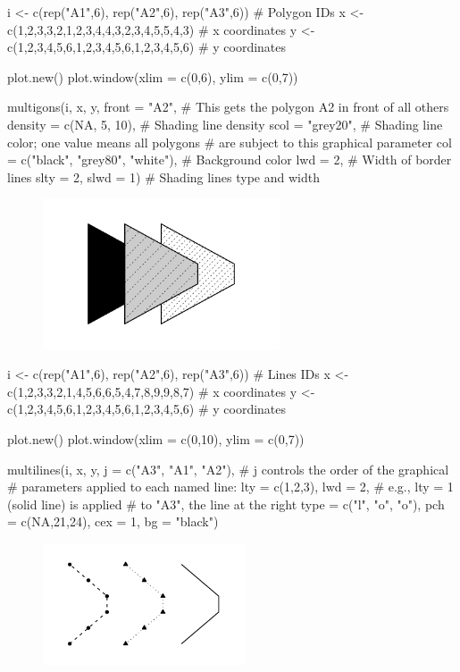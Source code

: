 \begin{example}
i <- c(rep("A1",6), rep("A2",6), rep("A3",6)) # Polygon IDs
x <- c(1,2,3,3,2,1,2,3,4,4,3,2,3,4,5,5,4,3)   # x coordinates
y <- c(1,2,3,4,5,6,1,2,3,4,5,6,1,2,3,4,5,6)   # y coordinates
	
plot.new()
plot.window(xlim = c(0,6), ylim = c(0,7))

multigons(i, x, y,
          front = "A2", # This gets the polygon A2 in front of all others
          density = c(NA, 5, 10),  # Shading line density
          scol = "grey20", # Shading line color; one value means all polygons
                           # are subject to this graphical parameter
          col = c("black", "grey80", "white"), # Background color
          lwd = 2, # Width of border lines
          slty = 2, slwd = 1) # Shading lines type and width  
\end{example}

\begin{figure}[H]
	\centering
	\includegraphics[width=70mm]{multigons}
\end{figure}

\begin{example}
i <- c(rep("A1",6), rep("A2",6), rep("A3",6)) # Lines IDs
x <- c(1,2,3,3,2,1,4,5,6,6,5,4,7,8,9,9,8,7)   # x coordinates
y <- c(1,2,3,4,5,6,1,2,3,4,5,6,1,2,3,4,5,6)   # y coordinates
	
plot.new()
plot.window(xlim = c(0,10), ylim = c(0,7))
	
multilines(i, x, y, 
           j = c("A3", "A1", "A2"),  # j controls the order of the graphical 
                                     # parameters applied to each named line:
           lty =  c(1,2,3), lwd = 2, # e.g., lty = 1 (solid line) is applied  
                                     # to "A3", the line at the right
           type = c("l", "o", "o"), 
           pch = c(NA,21,24), cex = 1, bg = "black")
\end{example}

\begin{figure}[H]
	\centering
	\includegraphics[width=60mm]{multilines}
\end{figure}

